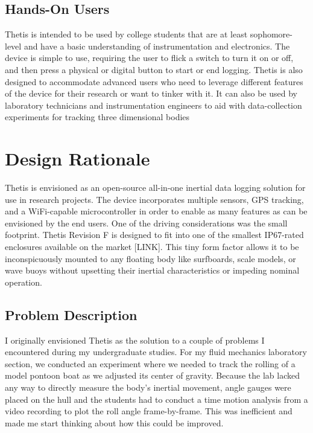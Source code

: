 \subsection{Hands-On Users} \label{ssec:hands_on_users}
Thetis is intended to be used by college students that are at least sophomore-level and have a basic understanding of instrumentation and electronics.
The device is simple to use, requiring the user to flick a switch to turn it on or off, and then press a physical or digital button to start or end logging.
Thetis is also designed to accommodate advanced users who need to leverage different features of the device for their research or want to tinker with it.
It can also be used by laboratory technicians and instrumentation engineers to aid with data-collection experiments for tracking three dimensional bodies

\section{Design Rationale} \label{sec:design_rationale}
Thetis is envisioned as an open-source all-in-one inertial data logging solution for use in research projects.
The device incorporates multiple sensors, GPS tracking, and a WiFi-capable microcontroller in order to enable as many features as can be envisioned by the end users.
One of the driving considerations was the small footprint.
Thetis Revision F is designed to fit into one of the smallest IP67-rated enclosures available on the market [LINK].  
This tiny form factor allows it to be inconspicuously mounted to any floating body like surfboards, scale models, or wave buoys without upsetting their inertial characteristics or impeding nominal operation.

\subsection{Problem Description} \label{ssec:problem_desc}
I originally envisioned Thetis as the solution to a couple of problems I encountered during my undergraduate studies.
For my fluid mechanics laboratory section, we conducted an experiment where we needed to track the rolling of a model pontoon boat as we adjusted its center of gravity.
Because the lab lacked any way to directly measure the body's inertial movement, angle gauges were placed on the hull and the students had to conduct a time motion analysis from a video recording to plot the roll angle frame-by-frame.
This was inefficient and made me start thinking about how this could be improved.


